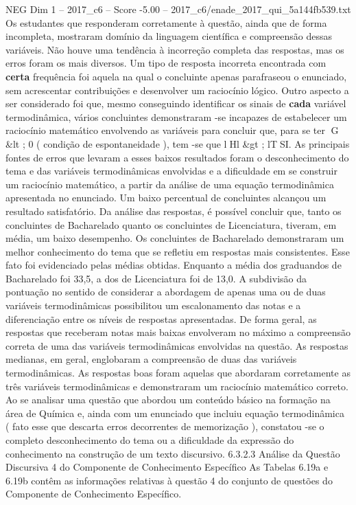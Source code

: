 \begin{textsample}{NEG Dim 1 – 2017\_c6 – Score -5.00 – 2017\_c6/enade\_2017\_qui\_5a144fb539.txt}
Os estudantes que responderam corretamente à questão, ainda que de forma incompleta, mostraram domínio da linguagem científica e compreensão dessas variáveis.
Não houve uma tendência à incorreção completa das respostas, mas os erros foram os mais diversos.
Um tipo de resposta incorreta encontrada com \textbf{certa} frequência foi aquela na qual o concluinte apenas parafraseou o enunciado, sem acrescentar contribuições e desenvolver um raciocínio lógico.
Outro aspecto a ser considerado foi que, mesmo conseguindo identificar os sinais de \textbf{cada} variável termodinâmica, vários concluintes demonstraram -se incapazes de estabelecer um raciocínio matemático envolvendo as variáveis para concluir que, para se ter G \&lt ; 0 ( condição de espontaneidade ), tem -se que lHl \&gt ; lTSI.
As principais fontes de erros que levaram a esses baixos resultados foram o desconhecimento do tema e das variáveis termodinâmicas envolvidas e a dificuldade em se construir um raciocínio matemático, a partir da análise de uma equação termodinâmica apresentada no enunciado.
Um baixo percentual de concluintes alcançou um resultado satisfatório.
Da análise das respostas, é possível concluir que, tanto os concluintes de Bacharelado quanto os concluintes de Licenciatura, tiveram, em média, um baixo desempenho.
Os concluintes de Bacharelado demonstraram um melhor conhecimento do tema que se refletiu em respostas mais consistentes.
Esse fato foi evidenciado pelas médias obtidas.
Enquanto a média dos graduandos de Bacharelado foi 33,5, a dos de Licenciatura foi de 13,0.
A subdivisão da pontuação no sentido de considerar a abordagem de apenas uma ou de duas variáveis termodinâmicas possibilitou um escalonamento das notas e a diferenciação entre os níveis de respostas apresentadas.
De forma geral, as respostas que receberam notas mais baixas envolveram no máximo a compreensão correta de uma das variáveis termodinâmicas envolvidas na questão.
As respostas medianas, em geral, englobaram a compreensão de duas das variáveis termodinâmicas.
As respostas boas foram aquelas que abordaram corretamente as três variáveis termodinâmicas e demonstraram um raciocínio matemático correto.
Ao se analisar uma questão que abordou um conteúdo básico na formação na área de Química e, ainda com um enunciado que incluiu equação termodinâmica ( fato esse que descarta erros decorrentes de memorização ), constatou -se o completo desconhecimento do tema ou a dificuldade da expressão do conhecimento na construção de um texto discursivo. 6.3.2.3 Análise da Questão Discursiva 4 do Componente de Conhecimento Específico As Tabelas 6.19a e 6.19b contêm as informações relativas à questão 4 do conjunto de questões do Componente de Conhecimento Específico.

\end{textsample}
